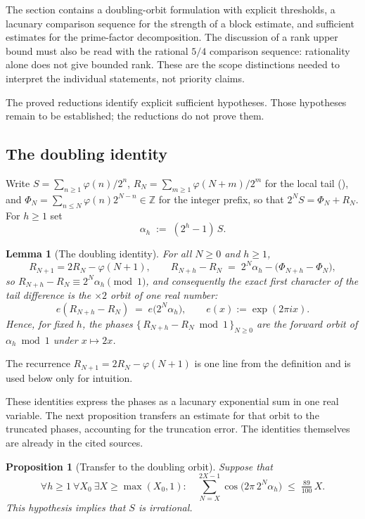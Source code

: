 \documentclass[11pt]{article}
\theoremstyle{plain}
\newtheorem{lem}[thm]{Lemma}
\newtheorem{prop}[thm]{Proposition}
\theoremstyle{definition}
\theoremstyle{remark}
\newcommand{\lean}[2]{\leanlink{#2}}
\newcommand{\Z}{\mathbb{Z}}
\begin{document}
The section contains a doubling-orbit formulation with explicit thresholds,
a lacunary comparison sequence for the strength of a block estimate,
and sufficient estimates for the prime-factor decomposition. The discussion of a rank upper bound
must also be read with the rational $5/4$ comparison sequence: rationality
alone does not give bounded rank. These are the scope distinctions needed
to interpret the individual statements, not priority claims.


The proved reductions identify explicit sufficient hypotheses. Those
hypotheses remain to be established; the reductions do not prove them.

\subsection{The doubling identity}

Write $S=\sum_{n\ge 1}\varphi(n)/2^n$, $R_N=\sum_{m\ge 1}\varphi(N+m)/2^m$
for the local tail
(\lean{Erdos249257.\allowbreak TotientTailPeriodKiller.\allowbreak totientTail}{TotientTailPeriodKiller.lean:57}),
and $\Phi_N=\sum_{n\le N}\varphi(n)2^{N-n}\in\Z$ for the integer prefix, so
that $2^N S=\Phi_N+R_N$. For $h\ge 1$ set
\[
  \alpha_h \;:=\; (2^h-1)\,S .
\]

\begin{lem}[The doubling identity]\label{lem:orbit}
For all $N\ge 0$ and $h\ge 1$,
\[
  R_{N+1}=2R_N-\varphi(N+1),
  \qquad
  R_{N+h}-R_N \;=\; 2^N\alpha_h-\bigl(\Phi_{N+h}-\Phi_N\bigr),
\]
so $R_{N+h}-R_N \equiv 2^N\alpha_h \pmod 1$, and consequently the exact
first character of the tail difference is the $\times 2$ orbit of one real
number:
\[
  e(R_{N+h}-R_N)
  \;=\; e\bigl(2^N\alpha_h\bigr),
  \qquad e(x):=\exp(2\pi i x).
\]
Hence, for fixed $h$, the phases $\{\,R_{N+h}-R_N \bmod 1\,\}_{N\ge 0}$ are
the forward orbit of $\alpha_h \bmod 1$ under $x\mapsto 2x$.
\end{lem}

\noindent
The recurrence $R_{N+1}=2R_N-\varphi(N+1)$ is one line from the definition
and is used below only for intuition.

These identities express the phases as a lacunary exponential sum in
one real variable. The next proposition transfers an estimate for that
orbit to the truncated phases, accounting for the truncation error.
The identities themselves are already in the cited sources.


\begin{prop}[Transfer to the doubling orbit]\label{prop:transfer}
Suppose that
\[
  \forall h\ge 1\ \forall X_0\ \exists X\ge \max(X_0,1):\quad
  \sum_{N=X}^{2X-1}\cos\bigl(2\pi\,2^{N}\alpha_h\bigr)\;\le\;\tfrac{89}{100}\,X .
\]
This hypothesis implies that $S$ is irrational.
\end{prop}
\end{document}

